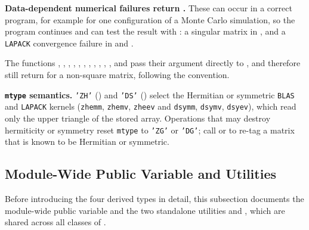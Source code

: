 \textbf{Data-dependent numerical failures return .} These can occur in a correct program, for example for one configuration of a Monte Carlo simulation, so the program continues and can test the result with : a singular matrix in , and a \texttt{LAPACK} convergence failure in  and .

{\sloppy The functions , , , , , , , , , , , and  pass their argument directly to , and therefore still return  for a non-square matrix, following the  convention.\par}

\textbf{\texttt{mtype} semantics.} \texttt{'ZH'} () and \texttt{'DS'} () select the Hermitian or symmetric \texttt{BLAS} and \texttt{LAPACK} kernels (\texttt{zhemm}, \texttt{zhemv}, \texttt{zheev} and \texttt{dsymm}, \texttt{dsymv}, \texttt{dsyev}), which read only the upper triangle of the stored array. Operations that may destroy hermiticity or symmetry reset \texttt{mtype} to \texttt{'ZG'} or \texttt{'DG'}; call  or  to re-tag a matrix that is known to be Hermitian or symmetric.

\subsection{Module-Wide Public Variable and Utilities}
\label{subsec:mod_utilities}

Before introducing the four derived types in detail, this subsection documents the module-wide public variable  and the two standalone utilities  and , which are shared across all classes of .


